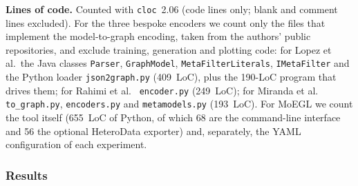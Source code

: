 \documentclass[journal,article,submit,moreauthors,technologies]{Definitions/mdpi}
\newcommand{\rev}[1]{#1}
\begin{document}
\rev{\textbf{Lines of code.} Counted with \texttt{cloc}~2.06 (code lines only; blank and comment lines excluded). For the three bespoke encoders we count only the files that implement the model-to-graph encoding, taken from the authors' public repositories, and exclude training, generation and plotting code: for Lopez et al.\ the Java classes \texttt{Parser}, \texttt{GraphModel}, \texttt{MetaFilterLiterals}, \texttt{IMetaFilter} and the Python loader \texttt{json2graph.py} (409~LoC), plus the 190-LoC program that drives them; for Rahimi et al.~\cite{rahimi2023towards} \texttt{encoder.py} (249~LoC); for Miranda et al.~\cite{miranda2024towards} \texttt{to\_graph.py}, \texttt{encoders.py} and \texttt{metamodels.py} (193~LoC). For MoEGL we count the tool itself (655~LoC of Python, of which 68 are the command-line interface and 56 the optional HeteroData exporter) and, separately, the YAML configuration of each experiment.}

\subsubsection{\rev{Results}}
\end{document}
